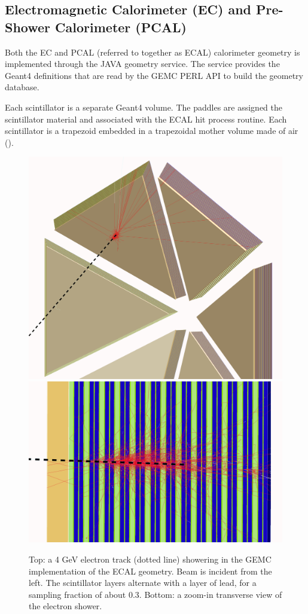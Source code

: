 \subsection{Electromagnetic Calorimeter (EC) and Pre-Shower Calorimeter (PCAL)}

Both the EC and PCAL (referred to together as ECAL) calorimeter geometry is implemented through the JAVA geometry service.
The service provides the Geant4 definitions that are read by the GEMC PERL API to build the geometry database.

Each scintillator is a separate Geant4 volume. The paddles are assigned the scintillator material
and associated with the ECAL hit process routine.
Each scintillator is a trapezoid embedded in a trapezoidal mother volume made of air ().

\begin{figure}
	\centering
	\includegraphics[width=0.99\columnwidth,keepaspectratio]{img/ecGeometry.png}
	\includegraphics[width=0.99\columnwidth,keepaspectratio]{img/ecDetail.png}
	\caption{Top: a 4 GeV electron track (dotted line) showering in the GEMC implementation of the ECAL geometry.
        	 Beam is incident from the left.
             The scintillator layers alternate with a layer of lead, for a sampling fraction of about 0.3.
             Bottom: a zoom-in transverse view of the electron shower.}
	\label{fig:ecGeometry}
\end{figure}

